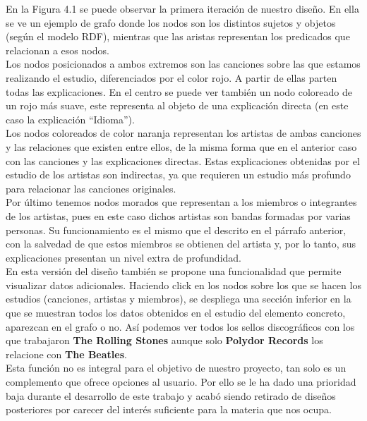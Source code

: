 En la Figura 4.1 se puede observar la primera iteración de nuestro diseño. En ella se ve un ejemplo de grafo donde los nodos son los distintos sujetos y objetos (según el modelo RDF), mientras que las aristas representan los predicados que relacionan a esos nodos.\\

Los nodos posicionados a ambos extremos son las canciones sobre las que estamos realizando el estudio, diferenciados por el color rojo. A partir de ellas parten todas las explicaciones. En el centro se puede ver también un nodo coloreado de un rojo más suave, este representa al objeto de una explicación directa (en este caso la explicación ``Idioma'').\\

Los nodos coloreados de color naranja representan los artistas de ambas canciones y las relaciones que existen entre ellos, de la misma forma que en el anterior caso con las canciones y las explicaciones directas. Estas explicaciones obtenidas por el estudio de los artistas son indirectas, ya que requieren un estudio más profundo para relacionar las canciones originales.\\

Por último tenemos nodos morados que representan a los miembros o integrantes de los artistas, pues en este caso dichos artistas son bandas formadas por varias personas. Su funcionamiento es el mismo que el descrito en el párrafo anterior, con la salvedad de que estos miembros se obtienen del artista y, por lo tanto, sus explicaciones presentan un nivel extra de profundidad.\\

En esta versión del diseño también se propone una funcionalidad que permite visualizar datos adicionales. Haciendo click en los nodos sobre los que se hacen los estudios (canciones, artistas y miembros), se despliega una sección inferior en la que se muestran todos los datos obtenidos en el estudio del elemento concreto, aparezcan en el grafo o no. Así podemos ver todos los sellos discográficos con los que trabajaron \textbf{The Rolling Stones} aunque solo \textbf{Polydor Records} los relacione con \textbf{The Beatles}.\\

Esta función no es integral para el objetivo de nuestro proyecto, tan solo es un complemento que ofrece opciones al usuario. Por ello se le ha dado una prioridad baja durante el desarrollo de este trabajo y acabó siendo retirado de diseños posteriores por carecer del interés suficiente para la materia que nos ocupa.\\

